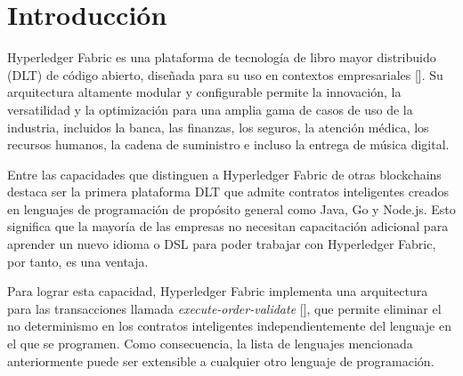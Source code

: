 \chapter*{Introducción}\label{chapter:introduction}

Hyperledger Fabric es una plataforma de tecnología de libro mayor distribuido (DLT) de código abierto, diseñada para su uso en contextos empresariales [\cite{hlf-doc}]. Su arquitectura altamente modular y configurable permite la innovación, la versatilidad y la optimización para una amplia gama de casos de uso de la industria, incluidos la banca, las finanzas, los seguros, la atención médica, los recursos humanos, la cadena de suministro e incluso la entrega de música digital.

Entre las capacidades que distinguen a Hyperledger Fabric de otras blockchains destaca ser la primera plataforma DLT que admite contratos inteligentes creados en lenguajes de programación de propósito general como Java, Go y Node.js.
Esto significa que la mayoría de las empresas no necesitan capacitación adicional para aprender un nuevo idioma o DSL para poder trabajar con Hyperledger Fabric, por tanto, es una ventaja.

Para lograr esta capacidad, Hyperledger Fabric implementa una arquitectura para las transacciones llamada \textit{execute-order-validate} [\cite{hlf-doc}], que permite eliminar el no determinismo en los contratos inteligentes independientemente del lenguaje en el que se programen. Como consecuencia, la lista de lenguajes mencionada anteriormente puede ser extensible a cualquier otro lenguaje de programación. 




